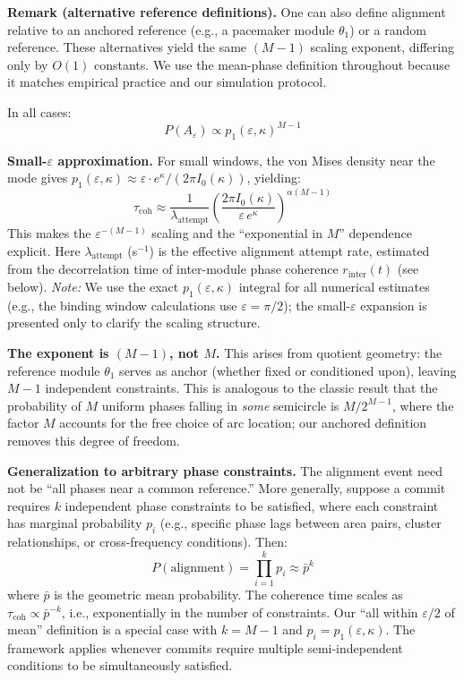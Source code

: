 \documentclass[12pt]{article}
\begin{document}
\textbf{Remark (alternative reference definitions).} One can also define alignment relative to an anchored reference (e.g., a pacemaker module $\theta_1$) or a random reference. These alternatives yield the same $(M-1)$ scaling exponent, differing only by $O(1)$ constants. We use the mean-phase definition throughout because it matches empirical practice and our simulation protocol.

In all cases:
\begin{equation}\label{eq:coh-mises}
P(A_\varepsilon) \propto p_1(\varepsilon, \kappa)^{M-1}
\end{equation}

\textbf{Small-$\varepsilon$ approximation.} For small windows, the von Mises density near the mode gives $p_1(\varepsilon, \kappa) \approx \varepsilon \cdot e^\kappa / (2\pi I_0(\kappa))$, yielding:
\[
\tau_{\mathrm{coh}} \approx \frac{1}{\lambda_{\mathrm{attempt}}} \left( \frac{2\pi I_0(\kappa)}{\varepsilon \, e^\kappa} \right)^{\alpha(M-1)}
\]
This makes the $\varepsilon^{-(M-1)}$ scaling and the ``exponential in $M$'' dependence explicit. Here $\lambda_{\mathrm{attempt}}$ (s$^{-1}$) is the effective alignment attempt rate, estimated from the decorrelation time of inter-module phase coherence $r_{\mathrm{inter}}(t)$ (see below). \emph{Note:} We use the exact $p_1(\varepsilon, \kappa)$ integral for all numerical estimates (e.g., the binding window calculations use $\varepsilon = \pi/2$); the small-$\varepsilon$ expansion is presented only to clarify the scaling structure.

\textbf{The exponent is $(M-1)$, not $M$.} This arises from quotient geometry: the reference module $\theta_1$ serves as anchor (whether fixed or conditioned upon), leaving $M-1$ independent constraints. This is analogous to the classic result that the probability of $M$ uniform phases falling in \emph{some} semicircle is $M/2^{M-1}$, where the factor $M$ accounts for the free choice of arc location; our anchored definition removes this degree of freedom.

\textbf{Generalization to arbitrary phase constraints.} The alignment event need not be ``all phases near a common reference.'' More generally, suppose a commit requires $k$ independent phase constraints to be satisfied, where each constraint has marginal probability $p_i$ (e.g., specific phase lags between area pairs, cluster relationships, or cross-frequency conditions). Then:
\[
P(\text{alignment}) = \prod_{i=1}^k p_i \approx \bar{p}^k
\]
where $\bar{p}$ is the geometric mean probability. The coherence time scales as $\tau_{\mathrm{coh}} \propto \bar{p}^{-k}$, i.e., exponentially in the number of constraints. Our ``all within $\varepsilon/2$ of mean'' definition is a special case with $k = M-1$ and $p_i = p_1(\varepsilon, \kappa)$. The framework applies whenever commits require multiple semi-independent conditions to be simultaneously satisfied.
\end{document}
